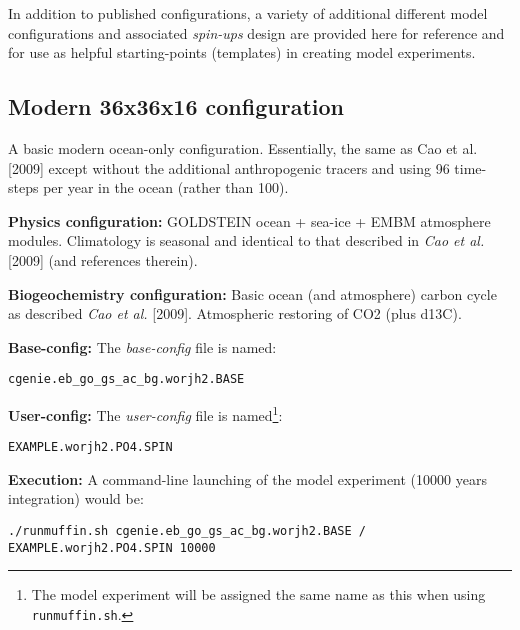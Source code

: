 \documentclass[10pt,twoside]{article}
\begin{document}
In addition to published configurations, a variety of additional different model configurations and associated \textit{spin-ups} design are provided here for reference and for use as helpful starting-points (templates) in creating model experiments.


\subsection{Modern 36x36x16 configuration}\label{EXAMPLE.worjh2.PO4.SPIN}

A basic modern ocean-only configuration. Essentially, the same as Cao et al. [2009] except without the additional anthropogenic tracers and using 96 time-steps per year in the ocean (rather than 100).

\noindent \textbf{Physics configuration:} GOLDSTEIN ocean + sea-ice + EMBM atmosphere modules. Climatology is seasonal and identical to that described in \textit{Cao et al.} [2009] (and references therein).

\noindent \textbf{Biogeochemistry configuration:} Basic ocean (and atmosphere) carbon cycle as described \textit{Cao et al.} [2009]. Atmospheric restoring of CO2 (plus d13C).

\noindent \textbf{Base-config:} The \textit{base-config} file is named:
\vspace{-10pt}\begin{verbatim}cgenie.eb_go_gs_ac_bg.worjh2.BASE\end{verbatim}\vspace{-10pt}

\noindent \textbf{User-config:} The \textit{user-config} file is named\footnote{The model experiment will be assigned the same name as this when using \texttt{runmuffin.sh}.}:
\vspace{-10pt}\begin{verbatim}EXAMPLE.worjh2.PO4.SPIN\end{verbatim}\vspace{-10pt}

\noindent \textbf{Execution:} A command-line launching of the model experiment (10000 years integration) would be:
\vspace{-10pt}\begin{verbatim}./runmuffin.sh cgenie.eb_go_gs_ac_bg.worjh2.BASE /
EXAMPLE.worjh2.PO4.SPIN 10000\end{verbatim}\vspace{-5pt}
\end{document}
